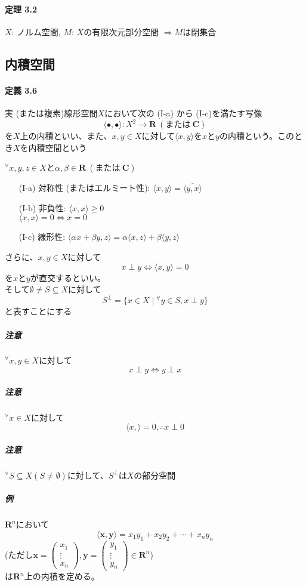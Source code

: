\documentclass[12pt,a4paper]{article}
\begin{document}
  \paragraph{定理 3.2}
    $X$: ノルム空間, $M$: $X$の有限次元部分空間 $\Rightarrow M$は閉集合
  \subsection{内積空間}
  \paragraph{定義 3.6}
    実 (または複素)線形空間$X$において次の (I-a) から (I-c)を満たす写像
    \[ \langle \bullet, \bullet \rangle : X^2 \rightarrow \mathbf{R} \ (\text{または} \  \mathbf{C}) \]
    を$X$上の内積といい、また、$x,y\in X$に対して$\langle x,y \rangle$を$x$と$y$の内積という。このとき$X$を内積空間という

    ${}^\forall x, y, z \in X$と$\alpha, \beta \in \mathbf{R} \ (\text{または} \ \mathbf{C})$
    \begin{itemize}
      \item[(I-a)] 対称性 (またはエルミート性): $\langle x, y \rangle = \overline{\langle y, x \rangle}$
      \item[(I-b)] 非負性: $\langle x, x \rangle \geq 0$ \\ $\langle x, x \rangle = 0 \Leftrightarrow x = 0$
      \item[(I-c)] 線形性: $\langle \alpha x + \beta y, z \rangle = \alpha \langle x, z \rangle + \beta \langle y, z \rangle$
    \end{itemize}

    さらに、$x,y\in X$に対して
    \[ x \perp y \Leftrightarrow \langle x, y \rangle = 0 \]
    を$x$と$y$が直交するといい。\\
    そして$\emptyset \neq S \subseteq X$に対して
    \[S^\perp = \lbrace x \in X \mid {}^\forall y \in S, x \perp y \rbrace \]
    と表すことにする

    \subparagraph{注意}
      ${}^\forall x,y \in X$に対して\\
      \[x\perp y \Leftrightarrow y \perp x\]
    \subparagraph{注意}
      ${}^\forall x \in X$に対して
      \[\langle x, \rangle = 0 , \therefore x \perp 0 \]
    \subparagraph{注意}
      ${}^\forall S \subseteq X ( S \neq \emptyset)$に対して、$S^\perp$は$X$の部分空間

    \subparagraph{例}
      $\mathbf{R}^n$において\\
      \[ \langle \mathbf{x}, \mathbf{y} \rangle = x_1 y_1 + x_2 y_2 + \cdots + x_n y_n\]
      (ただし$\mathbf{x} = \begin{pmatrix}x_1 \\ \vdots \\ x_n\end{pmatrix}, \mathbf{y} = \begin{pmatrix}y_1 \\ \vdots \\ y_n \end{pmatrix} \in \mathbf{R}^n$)\\
      は$\mathbf{R}^n$上の内積を定める。
\end{document}
